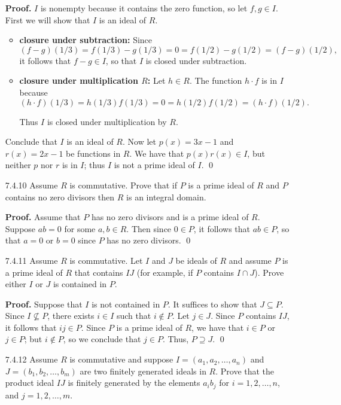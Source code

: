 \begin{enumerate}
      \textbf{Proof.} $I$ is nonempty because it contains the zero function, so
      let $f, g \in I$. First we will show that $I$ is an ideal of $R$.
      
      \begin{itemize}
         \item \textbf{closure under subtraction:} Since
               $$(f - g)(1/3) = f(1/3) - g(1/3) = 0 =
                 f(1/2) - g(1/2) = (f - g)(1/2),$$
               it follows that $f - g \in I$, so that $I$ is closed under
               subtraction.
         \item \textbf{closure under multiplication $R$:} Let $h \in R$. The
               function $h \cdot f$ is in $I$ because
               $$(h\cdot f)(1/3) = h(1/3)f(1/3) = 0 =
                  h(1/2)f(1/2) = (h\cdot f)(1/2).$$
                  
               Thus  $I$ is closed under multiplication by $R$.
      \end{itemize}
     
      Conclude that $I$ is an ideal of $R$. Now let $p(x) = 3x - 1$ and
      $r(x) = 2x - 1$ be functions in $R$. We have that $p(x)r(x) \in I$, but
      neither $p$ nor $r$ is in $I$; thus $I$ is not a prime ideal of $I$. \qed
   \item[7.4.10]  Assume $R$ is commutative. Prove that if $P$ is a prime ideal
                  of $R$ and $P$ contains no zero divisors then $R$ is an
                  integral domain.
                  
      \textbf{Proof.} Assume that $P$ has no zero divisors and is a prime ideal
      of $R$. Suppose $ab = 0$ for some $a, b \in R$. Then since $0 \in P$, it
      follows that $ab \in P$, so that $a = 0$ or $b = 0$ since $P$ has no zero
      divisors. \qed
   \item[7.4.11]  Assume $R$ is commutative. Let $I$ and $J$ be ideals of $R$
                  and assume $P$ is a prime ideal of $R$ that contains $IJ$ (for
                  example, if $P$ contains $I \cap J$). Prove either $I$ or $J$
                  is contained in $P$.
                  
      \textbf{Proof.} Suppose that $I$ is not contained in $P$. It suffices to
      show that $J \subseteq P$. Since $I \not\subseteq P$, there exists
      $i \in I$ such that $i \notin P$. Let $j \in J$. Since $P$ contains $IJ$,
      it follows that $ij\in P$. Since $P$ is a prime ideal of $R$, we have that
      $i \in P$ or $j \in P$; but $i \notin P$, so we conclude that $j \in P$.
      Thus, $P \supseteq J$. \qed
   \item[7.4.12]  Assume $R$ is commutative and suppose
                  $I = (a_1, a_2, \ldots, a_n)$ and
                  $J = (b_1, b_2, \ldots, b_m)$ are two finitely generated
                  ideals in $R$. Prove that the product ideal $IJ$ is finitely
                  generated by the elements $a_ib_j$ for $i = 1, 2, \ldots, n$,
                  and $j = 1, 2, \ldots, m$.


\end{enumerate}
